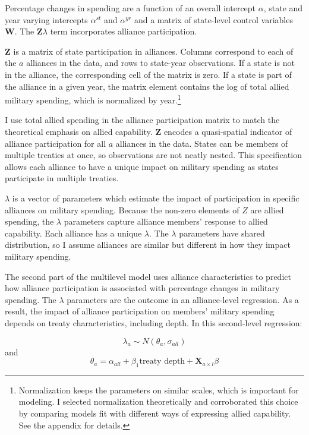 \documentclass[12pt]{article}
\begin{document}
Percentage changes in spending are a function of an overall intercept $\alpha$, state and year varying intercepts $\alpha^{st}$ and $\alpha^{yr}$ and a matrix of state-level control variables $\textbf{W}$.
The $\textbf{Z} \lambda$ term incorporates alliance participation.


$\textbf{Z}$ is a matrix of state participation in alliances. 
Columns correspond to each of the $a$ alliances in the data, and rows to state-year observations. 
If a state is not in the alliance, the corresponding cell of the matrix is zero.
If a state is part of the alliance in a given year, the matrix element contains the log of total allied military spending, which is normalized by year.\footnote{Normalization keeps the parameters on similar scales, which is important for modeling. I selected normalization theoretically and corroborated this choice by comparing models fit with different ways of expressing allied capability. See the appendix for details.} 


I use total allied spending in the alliance participation matrix to match the theoretical emphasis on allied capability. 
$\textbf{Z}$ encodes a quasi-spatial indicator of alliance participation for all $a$ alliances in the data. 
States can be members of multiple treaties at once, so observations are not neatly nested. 
This specification allows each alliance to have a unique impact on military spending as states participate in multiple treaties. 


$\lambda$ is a vector of parameters which estimate the impact of participation in specific alliances on military spending. 
Because the non-zero elements of $Z$ are allied spending, the $\lambda$ parameters capture alliance members' response to allied capability. 
Each alliance has a unique $\lambda$. 
The $\lambda$ parameters have shared distribution, so I assume alliances are similar but different in how they impact military spending. 


The second part of the multilevel model uses alliance characteristics to predict how alliance participation is associated with percentage changes in military spending. 
The $\lambda$ parameters are the outcome in an alliance-level regression.
As a result, the impact of alliance participation on members' military spending depends on treaty characteristics, including depth. 
In this second-level regression: 


\begin{equation}
\lambda_{a} \sim N(\theta_{a}, \sigma_{all})
\end{equation} 
and 
\begin{equation}
\theta_{a} = \alpha_{all} + \beta_1 \mbox{treaty depth} + \textbf{X}_{a \times l} \beta
\end{equation}
\end{document}
